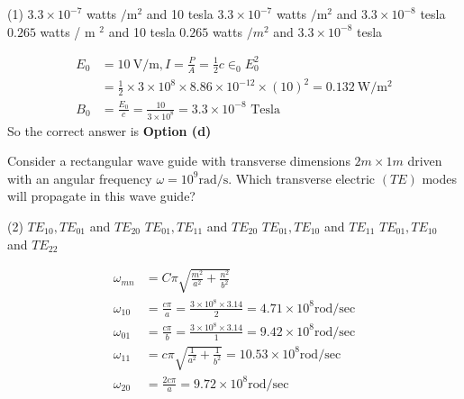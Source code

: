 \begin{enumerate}
\begin{minipage}{\textwidth}
	\end{minipage}
	\begin{tasks}(1)
		\task[\textbf{a.}] $3.3 \times 10^{-7}$ watts $/ \mathrm{m}^{2}$ and 10 tesla
		\task[\textbf{b.}]$3.3 \times 10^{-7}$ watts $/ \mathrm{m}^{2}$ and $3.3 \times 10^{-8}$ tesla
		\task[\textbf{c.}]$0.265$ watts / m $^{2}$ and 10 tesla
		\task[\textbf{d.}]$0.265$ watts $/ m^{2}$ and $3.3 \times 10^{-8}$ tesla	
	\end{tasks}
\begin{answer}
	\begin{align*}
	E_{0}&=10 \mathrm{~V} / \mathrm{m}, I=\frac{P}{A}=\frac{1}{2} c \in_{0} E_{0}^{2}\\&=\frac{1}{2} \times 3 \times 10^{8} \times 8.86 \times 10^{-12} \times(10)^{2}=0.132 \mathrm{~W} / \mathrm{m}^{2}\\
	B_{0}&=\frac{E_{0}}{c}=\frac{10}{3 \times 10^{8}}=3.3 \times 10^{-8}\text{ Tesla}
	\end{align*}
	So the correct answer is \textbf{Option (d)}
\end{answer}
	\begin{minipage}{\textwidth}
		\item Consider a rectangular wave guide with transverse dimensions $2 m \times 1 m$ driven with an angular frequency $\omega=10^{9} \mathrm{rad} / \mathrm{s}$. Which transverse electric $(T E)$ modes will propagate in this wave guide?
	\end{minipage}
	\begin{tasks}(2)
		\task[\textbf{a.}] $T E_{10}, T E_{01}$ and $T E_{20}$
		\task[\textbf{b.}]$T E_{01}, T E_{11}$ and $T E_{20}$
		\task[\textbf{c.}]$T E_{01}, T E_{10}$ and $T E_{11}$
		\task[\textbf{d.}]$T E_{01}, T E_{10}$ and $T E_{22}$
	\end{tasks}
\begin{answer}
	\begin{align*}
	\omega_{m n}&=C \pi \sqrt{\frac{m^{2}}{a^{2}}+\frac{n^{2}}{b^{2}}}\\
	\omega_{10}&=\frac{c \pi}{a}=\frac{3 \times 10^{8} \times 3.14}{2}=4.71 \times 10^{8} \mathrm{rod} / \mathrm{sec}\\
	\omega_{01}&=\frac{c \pi}{b}=\frac{3 \times 10^{8} \times 3.14}{1}=9.42 \times 10^{8} \mathrm{rod} / \mathrm{sec}\\
	\omega_{11}&=c \pi \sqrt{\frac{1}{a^{2}}+\frac{1}{b^{2}}}=10.53 \times 10^{8} \mathrm{rod} / \mathrm{sec}\\
	\omega_{20}&=\frac{2 c \pi}{a}=9.72 \times 10^{8} \mathrm{rod} / \mathrm{sec}\\

\end{align*}
\end{answer}
\end{enumerate}
